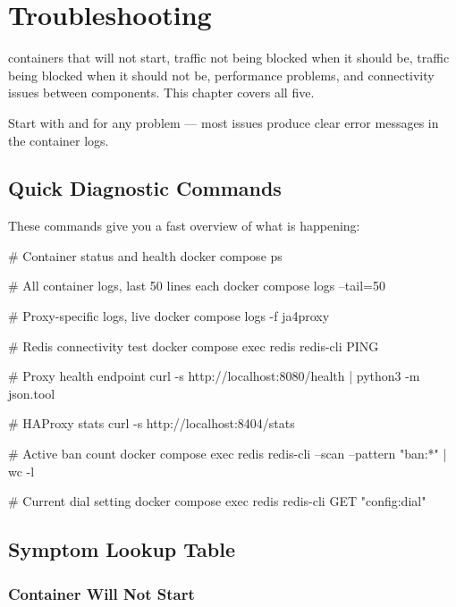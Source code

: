 
\chapter{Troubleshooting}
\label{ch:troubleshooting}

containers that will not start, traffic not being blocked when it should be,
traffic being blocked when it should not be, performance problems, and
connectivity issues between components. This chapter covers all five.

Start with  and  for any
problem — most issues produce clear error messages in the container logs.

\section{Quick Diagnostic Commands}

These commands give you a fast overview of what is happening:

\begin{bashcode}
# Container status and health
docker compose ps

# All container logs, last 50 lines each
docker compose logs --tail=50

# Proxy-specific logs, live
docker compose logs -f ja4proxy

# Redis connectivity test
docker compose exec redis redis-cli PING

# Proxy health endpoint
curl -s http://localhost:8080/health | python3 -m json.tool

# HAProxy stats
curl -s http://localhost:8404/stats

# Active ban count
docker compose exec redis redis-cli --scan --pattern "ban:*" | wc -l

# Current dial setting
docker compose exec redis redis-cli GET "config:dial"
\end{bashcode}

\section{Symptom Lookup Table}

\subsection{Container Will Not Start}

